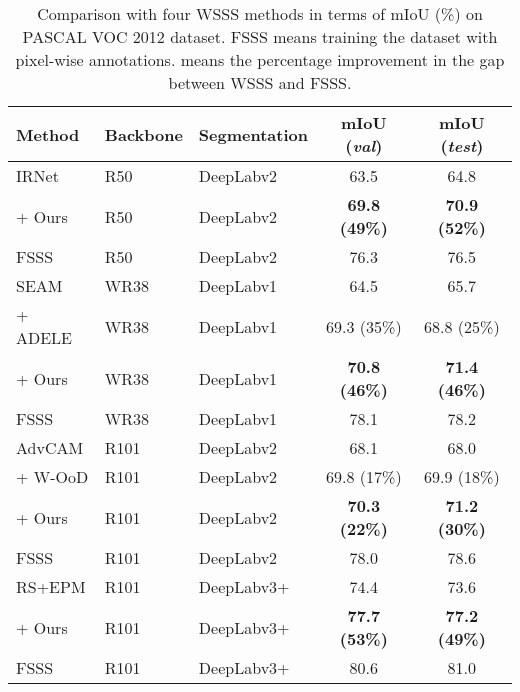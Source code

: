 \documentclass[10pt,twocolumn,letterpaper]{article}
\begin{document}
\begin{table}
    \centering
  \caption{ 
    Comparison with four WSSS methods \cite{ahn2019weakly, wang2020self, lee2021anti, jo2022recurseed} in terms of mIoU (\%) on PASCAL VOC 2012 dataset. FSSS means training the dataset with pixel-wise annotations.  means the percentage improvement in the gap between WSSS and FSSS.
  }
  \vspace{+0.1cm}
\begin{scriptsize}
  \begin{tabular}{p{} >{\centering}p{} >{\centering}p{} | c c}
    \toprule
    Method      & Backbone & Segmentation     & mIoU (\emph{val}) & mIoU (\emph{test}) \\
    \hline \hline
    IRNet \cite{ahn2019weakly} & R50 & DeepLabv2 & 63.5       & 64.8 \\
   \rowcolor{maroon!25} + Ours & R50 & DeepLabv2 & \textbf{69.8 (49\%)} & \textbf{70.9 (52\%)} \\
   FSSS & R50 & DeepLabv2 & 76.3 & 76.5 \\
   \hline
    SEAM \cite{wang2020self} & WR38 & DeepLabv1         & 64.5       & 65.7 \\
    + ADELE \cite{liu2022adaptive} & WR38 & DeepLabv1         & 69.3 (35\%)      & 68.8 (25\%) \\
   \rowcolor{maroon!25} + Ours & WR38 & DeepLabv1 & \textbf{70.8 (46\%)} & \textbf{71.4 (46\%)} \\
   FSSS & WR38 & DeepLabv1 & 78.1 & 78.2 \\
   \hline
   AdvCAM \cite{lee2021anti} & R101 & DeepLabv2         & 68.1       & 68.0 \\
    + W-OoD \cite{lee2022weakly} & R101 & DeepLabv2         & 69.8 (17\%)      & 69.9 (18\%) \\
   \rowcolor{maroon!25} + Ours & R101 & DeepLabv2 & \textbf{70.3 (22\%)} & \textbf{71.2 (30\%)} \\
FSSS & R101 & DeepLabv2 & 78.0 & 78.6 \\
   \hline
   RS+EPM \cite{jo2022recurseed} & R101 & DeepLabv3+         & 74.4       & 73.6 \\
   \rowcolor{maroon!25} + Ours & R101 & DeepLabv3+ & \textbf{77.7 (53\%)} & \textbf{77.2 (49\%)} \\
   FSSS & R101 & DeepLabv3+ & 80.6 & 81.0 \\
   \hline
    \bottomrule
  \end{tabular}
  \label{tab:wsss}
  \end{scriptsize}
  \vspace{-0.2cm}
\end{table}
\end{document}
